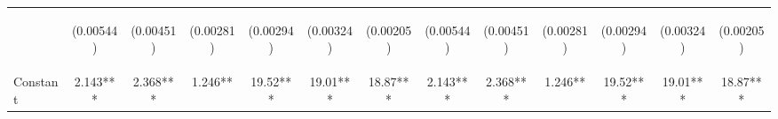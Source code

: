 \documentclass[]{article}
\begin{document}
\begin{center}
\begin{tabular}{lcccccccccccc}
\vspace{4pt} & \begin{footnotesize}(0.00544)\end{footnotesize} & \begin{footnotesize}(0.00451)\end{footnotesize} & \begin{footnotesize}(0.00281)\end{footnotesize} & \begin{footnotesize}(0.00294)\end{footnotesize} & \begin{footnotesize}(0.00324)\end{footnotesize} & \begin{footnotesize}(0.00205)\end{footnotesize} & \begin{footnotesize}(0.00544)\end{footnotesize} & \begin{footnotesize}(0.00451)\end{footnotesize} & \begin{footnotesize}(0.00281)\end{footnotesize} & \begin{footnotesize}(0.00294)\end{footnotesize} & \begin{footnotesize}(0.00324)\end{footnotesize} & \begin{footnotesize}(0.00205)\end{footnotesize} \\
Constant & 2.143*** & 2.368*** & 1.246** & 19.52*** & 19.01*** & 18.87*** & 2.143*** & 2.368*** & 1.246** & 19.52*** & 19.01*** & 18.87*** \\

\end{tabular}
\end{center}
\end{document}

